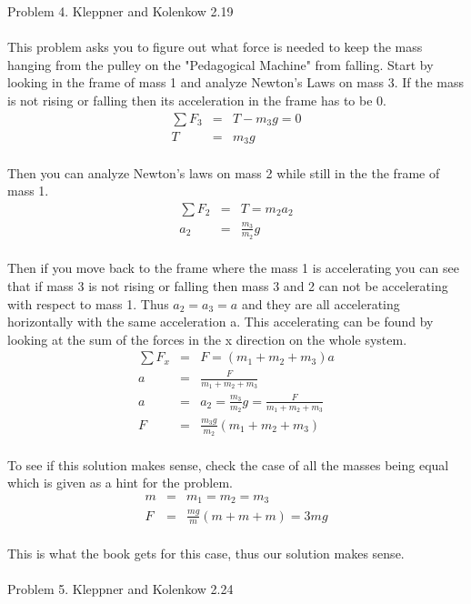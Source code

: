 \documentclass[11pt]{amsart}
\begin{document}
Problem 4. Kleppner and Kolenkow 2.19 \\ \\
This problem asks you to figure out what force is needed to keep the mass hanging from the pulley on the "Pedagogical Machine" from falling. Start by looking in the frame of mass 1 and analyze Newton's Laws on mass 3. If the mass is not rising or falling then its acceleration in the frame has to be 0. \\
\begin{eqnarray*}
\sum{F_{3}} &=& T-m_{3}g = 0 \\
T &=& m_{3}g
\end{eqnarray*} \\
Then you can analyze Newton's laws on mass 2 while still in the the frame of mass 1. \\ 
\begin{eqnarray*}
\sum{F_{2}} &=& T = m_{2}a_{2} \\
a_{2} &=& \frac{m_{3}}{m_{2}}g 
\end{eqnarray*} \\
Then if you move back to the frame where the mass 1 is accelerating you can see that if mass 3 is not rising or falling then mass 3 and 2 can not be accelerating with respect to mass 1. Thus $a_{2}=a_{3}=a$ and they are all accelerating horizontally with the same acceleration a. This accelerating can be found by looking at the sum of the forces in the x direction on the whole system. \\ 
\begin{eqnarray*}
\sum{F_{x}} &=& F = (m_{1}+m_{2}+m_{3})a \\
a &=& \frac{F}{m_{1}+m_{2}+m_{3}} \\
a &=& a_{2} = \frac{m_{3}}{m_{2}}g =\frac{F}{m_{1}+m_{2}+m_{3}} \\
F &=& \frac{m_{3}g}{m_{2}}(m_{1}+m_{2}+m_{3}) 
\end{eqnarray*} \\
To see if this solution makes sense, check the case of all the masses being equal which is given as a hint for the problem. \\
\begin{eqnarray*}
m &=& m_{1} = m_{2} = m_{3} \\
F &=& \frac{mg}{m}(m+m+m)  = 3mg 
\end{eqnarray*} \\
This is what the book gets for this case, thus our solution makes sense. \\ \\
Problem 5. Kleppner and Kolenkow 2.24 \\ \\
\end{document}
